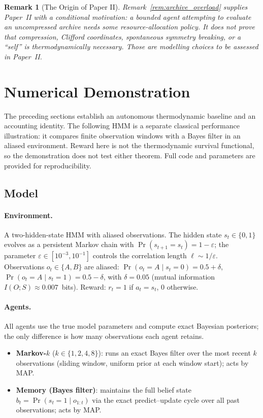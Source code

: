 \documentclass[12pt]{article}
\newtheorem{remark}[theorem]{Remark}
\begin{document}
\begin{remark}[The Origin of Paper II]
\label{rem:paper_II}
Remark~\ref{rem:archive_overload} supplies Paper~II with a conditional
motivation: a bounded agent attempting to evaluate an uncompressed
archive needs some resource-allocation policy.  It does not prove that
compression, Clifford coordinates, spontaneous symmetry breaking, or a
``self'' is thermodynamically necessary.  Those are modelling choices
to be assessed in Paper~II.
\end{remark}

\section{Numerical Demonstration}
\label{sec:numerical}

The preceding sections establish an autonomous thermodynamic baseline
and an accounting identity.  The following HMM is a separate classical
performance illustration: it compares finite observation windows with
a Bayes filter in an aliased environment.  Reward here is not the
thermodynamic survival functional, so the demonstration does not test
either theorem.
Full code and parameters are provided for reproducibility.

\subsection{Model}
\label{subsec:demo_model}

\paragraph{Environment.}
A two-hidden-state HMM with aliased observations.
The hidden state $s_t \in \{0,1\}$ evolves as a persistent
Markov chain with $\Pr(s_{t+1} = s_t) = 1 - \varepsilon$;
the parameter $\varepsilon \in [10^{-3}, 10^{-1}]$ controls
the correlation length $\ell \sim 1/\varepsilon$.
Observations $o_t \in \{A, B\}$ are aliased:
$\Pr(o_t = A \mid s_t = 0) = 0.5 + \delta$,
$\Pr(o_t = A \mid s_t = 1) = 0.5 - \delta$,
with $\delta = 0.05$ (mutual information
$I(O; S) \approx 0.007$~bits).
Reward: $r_t = 1$ if $a_t = s_t$, $0$ otherwise.

\paragraph{Agents.}
All agents use the true model parameters and compute
exact Bayesian posteriors; the only difference is how many
observations each agent retains.
\begin{itemize}
\item \textbf{Markov-$k$} ($k \in \{1,2,4,8\}$): runs
  an exact Bayes filter over the most recent $k$
  observations (sliding window, uniform prior at each
  window start); acts by MAP.
\item \textbf{Memory (Bayes filter)}: maintains the full
  belief state $b_t = \Pr(s_t = 1 \mid o_{1:t})$ via the
  exact predict--update cycle over all past observations;
  acts by MAP.
\end{itemize}
\end{document}
